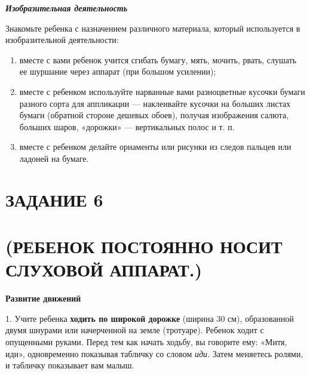 \documentclass{book}
\renewcommand{\emph}[1]{\textit{#1}}
\begin{document}
\emph{\textbf{Изобразительная деятельность}}

Знакомьте ребенка с назначением различного материала, который
используется в изобразительной деятельности:


\begin{enumerate}
\def\labelenumi{\arabic{enumi})}
\item
  
  вместе с вами ребенок учится сгибать бумагу, мять, мочить, рвать,
  слушать ее шуршание через аппарат (при большом усилении);
  
\item
  
  вместе с ребенком используйте нарванные вами разноцветные кусочки
  бумаги разного сорта для аппликации --- наклеивайте кусочки на больших
  листах бумаги (обратной стороне дешевых обоев), получая изображения
  салюта, больших шаров, «дорожки» --- вертикальных полос и т. п.
  
\item
  
  вместе с ребенком делайте орнаменты или рисунки из следов пальцев или
  ладоней на бумаге.
  
\end{enumerate}


\section{ЗАДАНИЕ 6}\section*{(РЕБЕНОК ПОСТОЯННО НОСИТ СЛУХОВОЙ АППАРАТ.)}

\textbf{Развитие движений}

1. Учите ребенка \textbf{ходить по широкой дорожке} (ширина 30 см),
образованной двумя шнурами или начерченной на земле (тротуаре). Ребенок
ходит с опущенными руками. Перед тем как начать ходьбу, вы говорите ему:
«Митя, иди», одновременно показывая табличку со словом \emph{иди.} Затем
меняетесь ролями, и табличку показывает вам малыш.
\end{document}

